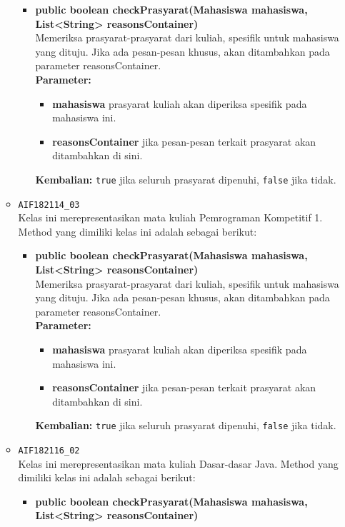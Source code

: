 \begin{enumerate}
\begin{itemize}
		\begin{itemize}
			\item \textbf{public boolean checkPrasyarat(Mahasiswa mahasiswa, List<String> reasonsContainer)}\\
			Memeriksa prasyarat-prasyarat dari kuliah, spesifik untuk mahasiswa yang dituju. Jika ada pesan-pesan khusus, akan ditambahkan pada parameter reasonsContainer.\\
			\textbf{Parameter:}
			\begin{itemize}
				\item \textbf{mahasiswa} prasyarat kuliah akan diperiksa spesifik pada mahasiswa ini.
				\item \textbf{reasonsContainer} jika pesan-pesan terkait prasyarat akan ditambahkan di sini.
			\end{itemize}
			\textbf{Kembalian:} \texttt{true} jika seluruh prasyarat dipenuhi, \texttt{false} jika tidak.
		\end{itemize}
		\item \texttt{AIF182114\_03} \\
		Kelas ini merepresentasikan mata kuliah Pemrograman Kompetitif 1. Method yang dimiliki kelas ini adalah sebagai berikut: 
		\begin{itemize}
			\item \textbf{public boolean checkPrasyarat(Mahasiswa mahasiswa, List<String> reasonsContainer)}\\
			Memeriksa prasyarat-prasyarat dari kuliah, spesifik untuk mahasiswa yang dituju. Jika ada pesan-pesan khusus, akan ditambahkan pada parameter reasonsContainer.\\
			\textbf{Parameter:}
			\begin{itemize}
				\item \textbf{mahasiswa} prasyarat kuliah akan diperiksa spesifik pada mahasiswa ini.
				\item \textbf{reasonsContainer} jika pesan-pesan terkait prasyarat akan ditambahkan di sini.
			\end{itemize}
			\textbf{Kembalian:} \texttt{true} jika seluruh prasyarat dipenuhi, \texttt{false} jika tidak.
		\end{itemize}
		\item \texttt{AIF182116\_02} \\
		Kelas ini merepresentasikan mata kuliah Dasar-dasar Java. Method yang dimiliki kelas ini adalah sebagai berikut: 
		\begin{itemize}
			\item \textbf{public boolean checkPrasyarat(Mahasiswa mahasiswa, List<String> reasonsContainer)}\\

\end{itemize}
\end{itemize}
\end{enumerate}
